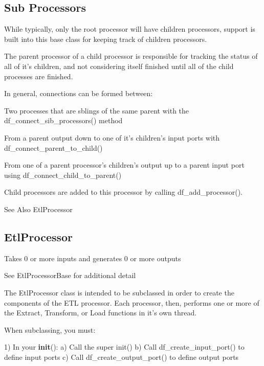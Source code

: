 \subsection*{Sub Processors }

While typically, only the root processor will have children processors, support is built into this base class for keeping track of children processors.

The parent processor of a child processor is responsible for tracking the status of all of it's children, and not considering itself finished until all of the child processes are finished.

In general, connections can be formed between\-:


\begin{DoxyItemize}
\item Two processes that are sblings of the same parent with the df\-\_\-connect\-\_\-sib\-\_\-processors() method
\item From a parent output down to one of it's children's input ports with df\-\_\-connect\-\_\-parent\-\_\-to\-\_\-child()
\item From one of a parent processor's children's output up to a parent input port using df\-\_\-connect\-\_\-child\-\_\-to\-\_\-parent()
\end{DoxyItemize}

Child processors are added to this processor by calling df\-\_\-add\-\_\-processor().

\begin{DoxySeeAlso}{See Also}
Etl\-Processor
\end{DoxySeeAlso}
\subsection*{Etl\-Processor }

Takes 0 or more inputs and generates 0 or more outputs

See Etl\-Processor\-Base for additional detail

The Etl\-Processor class is intended to be subclassed in order to create the components of the E\-T\-L processor. Each processor, then, performs one or more of the Extract, Transform, or Load functions in it's own thread.

When subclassing, you must\-:

1) In your {\bfseries init}()\-: a) Call the super init() b) Call df\-\_\-create\-\_\-input\-\_\-port() to define input ports c) Call df\-\_\-create\-\_\-output\-\_\-port() to define output ports


